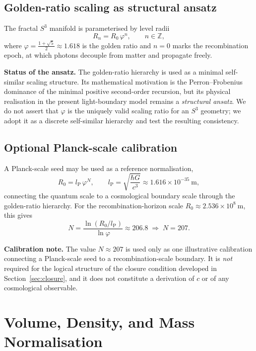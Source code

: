 \documentclass[11pt,a4paper]{article}
\newcommand{\lP}{l_{\mathrm{P}}}
\newcommand{\Rzero}{R_0}
\newcommand{\ph}{\varphi}
\begin{document}
\subsection{Golden-ratio scaling as structural ansatz}

The fractal $S^3$ manifold is parameterised by level radii
\[
  \boxed{R_n = \Rzero\,\ph^n,}
  \qquad n\in\mathbb{Z},
\]
where $\ph = \tfrac{1+\sqrt{5}}{2}\approx 1.618$ is the golden ratio and $n=0$
marks the recombination epoch, at which photons decouple from matter and propagate
freely.

\smallskip
\noindent\textbf{Status of the ansatz.}\;
The golden-ratio hierarchy is used as a minimal self-similar scaling structure.
Its mathematical motivation is the Perron--Frobenius dominance of the minimal
positive second-order recursion, but its physical realisation in the present
light-boundary model remains a \emph{structural ansatz}. We do not assert that
$\ph$ is the uniquely valid scaling ratio for an $S^3$ geometry; we adopt it as
a discrete self-similar hierarchy and test the resulting consistency.

\subsection{Optional Planck-scale calibration}

A Planck-scale seed may be used as a reference normalisation,
\[
  \Rzero = \lP\,\ph^N,
  \qquad \lP = \sqrt{\frac{\hbar G}{c^3}}\approx 1.616\times10^{-35}\ \mathrm{m},
\]
connecting the quantum scale to a cosmological boundary scale through the
golden-ratio hierarchy. For the recombination-horizon scale
$\Rzero\approx 2.536\times10^8\ \mathrm{m}$, this gives
\[
  N = \frac{\ln(\Rzero/\lP)}{\ln\ph}\approx 206.8 \;\Longrightarrow\; N = 207.
\]

\begin{notebox}
\textbf{Calibration note.}\quad
The value $N\approx 207$ is used only as one illustrative calibration connecting
a Planck-scale seed to a recombination-scale boundary. It is \emph{not} required
for the logical structure of the closure condition developed in
Section~\ref{sec:closure}, and it does not constitute a derivation of $c$ or of any
cosmological observable.
\end{notebox}

\section{Volume, Density, and Mass Normalisation}
\end{document}
